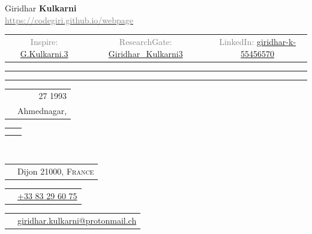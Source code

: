 
\setlength{\parindent}{0pt}
\pagestyle{empty}
\begin{center}
{	\huge \textsf{Giridhar \textbf{Kulkarni}}
} \\[1ex]
\href{https://codegiri.github.io/webpage}{\textcolor{gray}{https://codegiri.github.io/webpage}}
\\
\textcolor{gray}{\scriptsize%
\begin{tabular}{c|c|c}
	Inspire: \href{https://inspirehep.net/authors/1727127}{G.Kulkarni.3}
	&
	ResearchGate: \href{https://www.researchgate.net/profile/Giridhar_Kulkarni3}{Giridhar\_Kulkarni3}
	&
	LinkedIn: \href{https://www.linkedin.com/in/giridhar-k-55456570}{giridhar-k-55456570}
\end{tabular}
}
\end{center}
\rule[1em]{\linewidth}{.4pt}%
\vspace{-1em}
\rule[1em]{\linewidth}{1pt}
%
\begin{minipage}{0.74\textwidth}
\begin{tabularx}{1\textwidth}{M | D}
		&	27 1993
	\\
		&	Ahmednagar, \textsc{\india}
\end{tabularx}
\begin{tabularx}{1\textwidth}{M | D}
			&	
	\\
			& 	
\end{tabularx}
\\[.5em]
\begin{tabularx}{1\textwidth}{M | D}
		& 	Dijon 21000, \textsc{France}
\end{tabularx}
\begin{tabularx}{1\textwidth}{M | D}
		&	\href{tel:+33783296075}{+33\space\textperiodcentered{} 83 29 60 75}
\end{tabularx}
\begin{tabularx}{1\textwidth}{M | D}

			&	\href{mailto:giridhar.kulkarni@protonmail.ch}{giridhar.kulkarni@protonmail.ch}
\end{tabularx}
\end{minipage}
